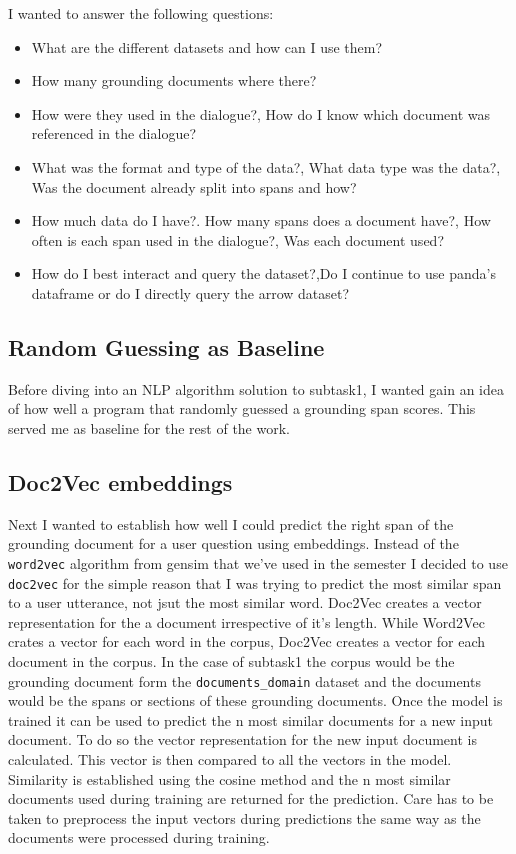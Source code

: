 \documentclass[11pt]{article}
\begin{document}
    I wanted to answer the following questions:
    \begin{itemize}
        \item What are the different datasets and how can I use them?
        \item How many grounding documents where there?
        \item How were they used in the dialogue?, How do I know which document was referenced in the dialogue?
        \item What was the format and type of the data?, What data type was the data?,
        Was the document already split into spans and how?
        \item How much data do I have?. How many spans does a document have?, How often is each span used in the dialogue?,
        Was each document used?
        \item How do I best interact and query the dataset?,Do I continue to use panda's dataframe or do I directly query
        the arrow dataset?
    \end{itemize}

    \subsection{Random Guessing as Baseline}\label{subsec:random-guessing-method}
    Before diving into an NLP algorithm solution to subtask1, I wanted gain an idea of how well a program that randomly guessed a
    grounding span scores. This served me as baseline for the rest of the work.

    \subsection{Doc2Vec embeddings}\label{subsec:doc2vc-method}
    Next I wanted to establish how well I could predict the right span of the grounding document for a user question using
    embeddings. Instead of the \texttt{word2vec} algorithm from gensim that we've used in the semester I decided to use
    \texttt{doc2vec} \cite{doc2vec} for the simple reason that I was trying to predict the most similar span to a user utterance, not jsut
    the most similar word. Doc2Vec creates a vector representation for the a document irrespective of it's length.
    While Word2Vec crates a vector for each word in the corpus, Doc2Vec creates a vector for each document in the corpus.
    In the case of subtask1 the corpus would be the grounding document form the \texttt{documents\_domain} dataset
    and the documents would be the spans or sections of these grounding documents. Once the model is trained
    it can be used to predict the n most similar documents for a new input document. To do so the vector representation
    for the new input document is calculated. This vector is then compared to all the vectors in the model. Similarity
    is established using the cosine method and the n most similar documents used during training are returned for the prediction.
    Care has to be taken to preprocess the input vectors during predictions
    the same way as the documents were processed during training.
\end{document}
